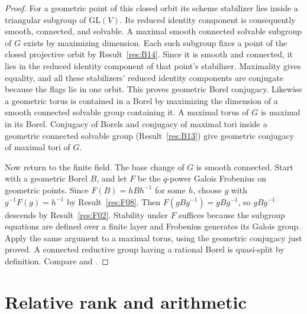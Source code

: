 \documentclass[11pt,a4paper,openany,oneside]{book}
\theoremstyle{resultstyle}
\theoremstyle{definition}
\numberwithin{equation}{chapter}
\newcommand{\GL}{\mathrm{GL}}
\begin{document}
\begin{proof}
For a geometric point of this closed orbit its scheme stabilizer
lies inside a triangular subgroup of \(\GL(V)\). Its reduced
identity component is consequently smooth, connected, and solvable.
A maximal smooth connected solvable subgroup of \(G\) exists by
maximizing dimension. Each such subgroup fixes a point of the
closed projective orbit by Result~\ref{res:B14}. Since it is
smooth and connected, it lies in the reduced identity component of
that point's stabilizer. Maximality gives equality, and all these
stabilizers' reduced identity components are conjugate because the
flags lie in one orbit. This proves geometric Borel conjugacy.
Likewise a geometric torus is contained in a Borel by maximizing
the dimension of a smooth connected solvable group containing it.
A maximal torus of \(G\) is maximal in its Borel. Conjugacy of
Borels and conjugacy of maximal tori inside a geometric connected
solvable group (Result~\ref{res:B13}) give geometric conjugacy
of maximal tori of \(G\).

Now return to the finite field. The base change of \(G\) is smooth
connected. Start with a geometric Borel \(B\), and let \(F\) be
the \(q\)-power Galois Frobenius on geometric points. Since
\(F(B)=hBh^{-1}\) for some \(h\), choose \(g\) with
\(g^{-1}F(g)=h^{-1}\) by Result~\ref{res:F08}. Then
\(F(gBg^{-1})=gBg^{-1}\), so \(gBg^{-1}\) descends by
Result~\ref{res:F02}. Stability under \(F\) suffices because the
subgroup equations are defined over a finite layer and Frobenius
generates its Galois group. Apply the same argument to a maximal
torus, using the geometric conjugacy just proved. A connected
reductive group having a rational Borel is quasi-split by definition.
Compare \cite[Example A.1.2 and Corollary A.1.5]{conradfeng}
and \cite[Sec.~25.a]{milne}.
\end{proof}

\section{Relative rank and arithmetic}
\end{document}
